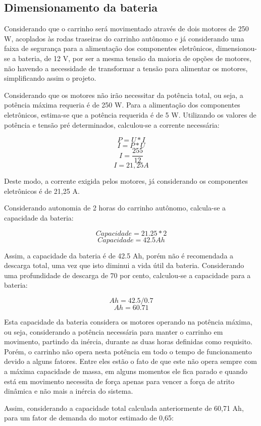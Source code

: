 \subsection{Dimensionamento da bateria}

\par Considerando que o carrinho será movimentado através de dois motores de 250 W, acoplados às rodas traseiras do carrinho autônomo e já considerando uma faixa de segurança para a alimentação dos componentes eletrônicos, dimensionou-se a bateria, de 12 V, por ser a mesma tensão da maioria de opções de motores, não havendo a necessidade de transformar a tensão para alimentar os motores, simplificando assim o projeto.
\par Considerando que os motores não irão necessitar da potência total, ou seja, a potência máxima requeria é de 250 W. Para a alimentação dos componentes eletrônicos, estima-se que a potência requerida é de 5 W. Utilizando os valores de potência e tensão pré determinados, calculou-se a corrente necessária:

$$ P= U*I$$
$$ I={P}*{U} $$
$$ I=\frac{255}{12}$$
$$ I= 21,25 A$$

\par Deste modo, a corrente exigida pelos motores, já considerando os componentes eletrônicos é de 21,25 A.
\par Considerando autonomia de 2 horas do carrinho autônomo, calcula-se a capacidade da bateria:

$$ Capacidade = 21.25*2$$
$$ Capacidade = 42.5 Ah $$

\par Assim, a capacidade da bateria é de 42.5 Ah, porém não é recomendada a descarga total, uma vez que isto diminui a vida útil da bateria. Considerando uma profundidade de descarga de 70 por cento, calculou-se a capacidade para a bateria:

$$ Ah={42.5}/{0.7}$$
$$ Ah= 60.71 $$


\par Esta capacidade da bateria considera os motores operando na potência máxima, ou seja, considerando a potência necessária para manter o carrinho em movimento, partindo da inércia, durante as duas horas definidas como requisito.  Porém, o carrinho não opera nesta potência em todo o tempo de funcionamento devido a alguns fatores. Entre eles estão o fato de que este não opera sempre com a máxima capacidade de massa, em alguns momentos ele fica parado e quando está em movimento necessita de força apenas para vencer a força de atrito dinâmica e não mais a inércia do sistema.
\par Assim, considerando a capacidade total calculada anteriormente de 60,71 Ah, para um fator de demanda do motor estimado de 0,65:

